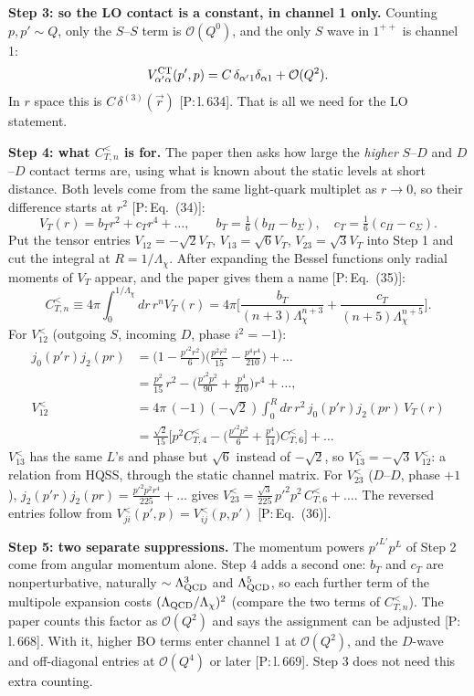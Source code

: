 \documentclass[11pt]{article}
\newcommand{\tagP}[1]{\textcolor{blue!65!black}{\textsf{\small[P:\,#1]}}}
\newenvironment{aiadd}{\par}{\par}
\begin{document}
\begin{aiadd}
	\textbf{Step 3: so the LO contact is a constant, in channel 1 only.} Counting $p,p'\sim Q$, only the $S$--$S$ term is $\mathcal O(Q^0)$, and the only $S$ wave in $1^{++}$ is channel 1:
	\[
		V^{\rm CT}_{\alpha'\alpha}(p',p)=C\,\delta_{\alpha'1}\delta_{\alpha1}+\mathcal O(Q^2).
	\]
	In $r$ space this is $C\,\delta^{(3)}(\vec r)$ \tagP{l.\,634}. That is all we need for the LO statement.

	\textbf{Step 4: what $C^<_{T,n}$ is for.} The paper then asks how large the \emph{higher} $S$--$D$ and $D$--$D$ contact terms are, using what is known about the static levels at short distance. Both levels come from the same light-quark multiplet as $r\to0$, so their difference starts at $r^2$ \tagP{Eq.~(34)}:
	\[
		V_T(r)=b_Tr^2+c_Tr^4+\dots,\qquad b_T=\tfrac16(b_\Pi-b_\Sigma),\quad c_T=\tfrac16(c_\Pi-c_\Sigma).
	\]
	Put the tensor entries $V_{12}=-\sqrt2V_T$, $V_{13}=\sqrt6V_T$, $V_{23}=\sqrt3V_T$ into Step 1 and cut the integral at $R=1/\Lambda_\chi$. After expanding the Bessel functions only radial moments of $V_T$ appear, and the paper gives them a name \tagP{Eq.~(35)}:
	\[
		C^<_{T,n}\equiv4\pi\int_0^{1/\Lambda_\chi}dr\,r^nV_T(r)=4\pi\Big[\frac{b_T}{(n+3)\Lambda_\chi^{n+3}}+\frac{c_T}{(n+5)\Lambda_\chi^{n+5}}\Big].
	\]
	For $V^<_{12}$ (outgoing $S$, incoming $D$, phase $i^2=-1$):
	\begin{align*}
		j_0(p'r)j_2(pr) & =\Big(1-\frac{p'^2r^2}{6}\Big)\Big(\frac{p^2r^2}{15}-\frac{p^4r^4}{210}\Big)+\dots                 \\
		                & =\frac{p^2}{15}\,r^2-\Big(\frac{p'^2p^2}{90}+\frac{p^4}{210}\Big)r^4+\dots,                        \\
		V^<_{12}        & =4\pi\,(-1)(-\sqrt2)\int_0^Rdr\,r^2\,j_0(p'r)j_2(pr)\,V_T(r)                                       \\
		                & =\frac{\sqrt2}{15}\Big[p^2C^<_{T,4}-\Big(\frac{p'^2p^2}{6}+\frac{p^4}{14}\Big)C^<_{T,6}\Big]+\dots
	\end{align*}
	$V^<_{13}$ has the same $L$'s and phase but $\sqrt6$ instead of $-\sqrt2$, so $V^<_{13}=-\sqrt3\,V^<_{12}$: a relation from HQSS, through the static channel matrix. For $V^<_{23}$ ($D$--$D$, phase $+1$), $j_2(p'r)j_2(pr)=\frac{p'^2p^2r^4}{225}+\dots$ gives $V^<_{23}=\frac{\sqrt3}{225}\,p'^2p^2\,C^<_{T,6}+\dots$. The reversed entries follow from $V^<_{ji}(p',p)=V^<_{ij}(p,p')$ \tagP{Eq.~(36)}.

	\textbf{Step 5: two separate suppressions.} The momentum powers $p'^{L'}p^L$ of Step 2 come from angular momentum alone. Step 4 adds a second one: $b_T$ and $c_T$ are nonperturbative, naturally $\sim\Lambda_{\rm QCD}^3$ and $\Lambda_{\rm QCD}^5$, so each further term of the multipole expansion costs $(\Lambda_{\rm QCD}/\Lambda_\chi)^2$ (compare the two terms of $C^<_{T,n}$). The paper counts this factor as $\mathcal O(Q^2)$ and says the assignment can be adjusted \tagP{l.\,668}. With it, higher BO terms enter channel 1 at $\mathcal O(Q^2)$, and the $D$-wave and off-diagonal entries at $\mathcal O(Q^4)$ or later \tagP{l.\,669}. Step 3 does not need this extra counting.


\end{aiadd}
\end{document}

